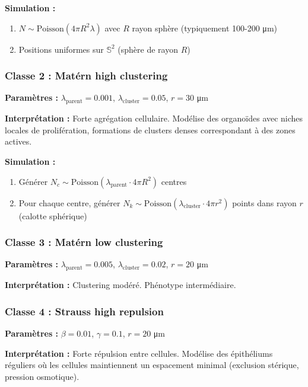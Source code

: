 \textbf{Simulation :}
\begin{enumerate}
    \item $N \sim \text{Poisson}(4\pi R^2 \lambda)$ avec $R$ rayon sphère (typiquement 100-200 μm)
    \item Positions uniformes sur $\mathbb{S}^2$ (sphère de rayon $R$)
\end{enumerate}

\subsubsection{Classe 2 : Matérn high clustering}

\textbf{Paramètres :} $\lambda_{\text{parent}} = 0.001$, $\lambda_{\text{cluster}} = 0.05$, $r = 30$ μm

\textbf{Interprétation :} Forte agrégation cellulaire. Modélise des organoïdes avec niches locales de prolifération, formations de clusters denses correspondant à des zones actives.

\textbf{Simulation :}
\begin{enumerate}
    \item Générer $N_c \sim \text{Poisson}(\lambda_{\text{parent}} \cdot 4\pi R^2)$ centres
    \item Pour chaque centre, générer $N_k \sim \text{Poisson}(\lambda_{\text{cluster}} \cdot 4\pi r^2)$ points dans rayon $r$ (calotte sphérique)
\end{enumerate}

\subsubsection{Classe 3 : Matérn low clustering}

\textbf{Paramètres :} $\lambda_{\text{parent}} = 0.005$, $\lambda_{\text{cluster}} = 0.02$, $r = 20$ μm

\textbf{Interprétation :} Clustering modéré. Phénotype intermédiaire.

\subsubsection{Classe 4 : Strauss high repulsion}

\textbf{Paramètres :} $\beta = 0.01$, $\gamma = 0.1$, $r = 20$ μm

\textbf{Interprétation :} Forte répulsion entre cellules. Modélise des épithéliums réguliers où les cellules maintiennent un espacement minimal (exclusion stérique, pression osmotique).

